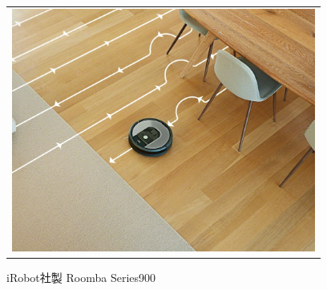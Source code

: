 \begin{figure}[htbp]
\begin{center}
\begin{tabular}{c}
\begin{minipage}{0.7\hsize}
\begin{center}
\includegraphics[width=10cm]{./picture/img-roomba.jpg}
\caption{iRobot社製 Roomba Series900}
\label{fig:Roomba}
\end{center}
\end{minipage}
\end{tabular}
\end{center}
\end{figure}

